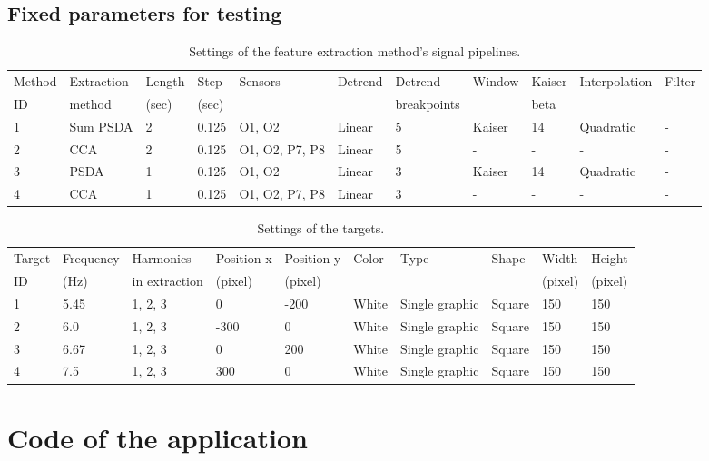 \begin{appendices}
\begin{landscape}
\section{Fixed parameters for testing}
\label{sec:parameters}
	\begin{table}[h]
		\centering
		\begin{tabular}{|l|l|l|l|l|l|l|l|l|l|l|}\hline
Method& Extraction& Length& Step	& Sensors		& Detrend	& Detrend	 & Window& Kaiser& Interpolation& Filter\\
ID	& method	& (sec)	& (sec)	& 				& 			& breakpoints& 		 & beta	 & 				&  \\\hline
1	& Sum PSDA	& 2		& 0.125	& O1, O2		& Linear	& 5			 & Kaiser& 14	 & Quadratic	&- \\\hline
2	& CCA		& 2		& 0.125	& O1, O2, P7, P8& Linear	& 5			 & -	 & -	 & -			&- \\\hline
3	& PSDA		& 1		& 0.125	& O1, O2		& Linear	& 3			 & Kaiser& 14	 & Quadratic	&- \\\hline
4	& CCA		& 1		& 0.125	& O1, O2, P7, P8& Linear	& 3			 & -	 & -	 & -			&- \\\hline
		\end{tabular}
		\caption{Settings of the feature extraction method's signal pipelines.}
		\label{tab:pipelines}
	\end{table}
	\begin{table}[h]
		\centering
		\begin{tabular}{|l|l|l|l|l|l|l|l|l|l|}\hline
Target	& Frequency & Harmonics		& Position x& Position y& Color	& Type			& Shape	 & Width 	& Height\\
ID		& (Hz)		& in extraction	& (pixel)	& (pixel)	& 		& 		 		& 		 & (pixel)	&(pixel)\\\hline
1		& 5.45		& 1, 2, 3		& 0		 	& -200		& White	& Single graphic& Square & 150	 	& 150\\\hline
2		& 6.0		& 1, 2, 3		& -300	 	& 0			& White	& Single graphic& Square & 150	 	& 150\\\hline
3		& 6.67		& 1, 2, 3		& 0		 	& 200		& White	& Single graphic& Square & 150	 	& 150\\\hline
4		& 7.5		& 1, 2, 3		& 300	 	& 0			& White	& Single graphic& Square & 150	 	& 150\\\hline
		\end{tabular}
		\caption{Settings of the targets.}
		\label{tab:targets}
	\end{table}
\end{landscape}
\newpage
\section{Code of the application}
\label{sec:code}


\end{appendices}
